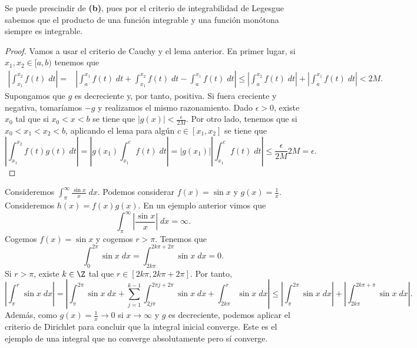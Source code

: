 \begin{observation}
\normalfont Se puede prescindir de \textbf{(b)}, pues por el criterio de integrabilidad de Legesgue sabemos que el producto de una función integrable y una función monótona siempre es integrable.
\end{observation}
\begin{proof}
Vamos a usar el criterio de Cauchy y el lema anterior. En primer lugar, si $\displaystyle x_{1}, x_{2} \in [a,b) $ tenemos que
\[
\begin{split}
	\left|\int^{x_{2}}_{x_{1}} f\left(t\right) \; dt\right| = & \left|\int^{x_{1}}_{a} f\left(t\right) \; dt + \int^{x_{2}}_{x_{1}} f\left(t\right) \; dt - \int^{x_{1}}_{a} f\left(t\right) \; dt\right| \leq \left|\int^{x_{2}}_{a} f\left(t\right) \; dt\right| + \left|\int^{x_{1}}_{a} f\left(t\right) \; dt\right| < 2M.
\end{split}
\]
Supongamos que $\displaystyle g $ es decreciente y, por tanto, positiva. Si fuera creciente y negativa, tomaríamos $\displaystyle -g $ y realizamos el mismo razonamiento. Dado $\displaystyle \epsilon > 0 $, existe $\displaystyle x_{0} $ tal que si $\displaystyle x_{0} < x < b $ se tiene que $\displaystyle \left|g\left(x\right)\right| < \frac{\epsilon }{2M} $. 
Por otro lado, tenemos que si $\displaystyle x_{0} < x_{1} < x_{2} < b $, aplicando el lema para algún $\displaystyle c \in \left[x_{1}, x_{2}\right]  $ se tiene que
\[ \left|\int^{x_{2}}_{x_{1}} f\left(t\right)g\left(t\right) \; dt\right| = \left|g\left(x_{1}\right)\int^{c}_{x_{1}} f\left(t\right) \; dt\right| = \left|g\left(x_{1}\right)\right| \left|\int^{c}_{x_{1}} f\left(t\right) \; dt\right| \leq \frac{\epsilon }{2M}2M = \epsilon  .\]
\end{proof}
\begin{eg}
\normalfont Consideremos $\displaystyle \int^{\infty}_{\pi} \frac{\sin x}{x} \; dx $. Podemos considerar $\displaystyle f\left(x\right) = \sin x$ y $\displaystyle g\left(x\right) = \frac{1}{x} $. Consideremos $\displaystyle h\left(x\right) = f\left(x\right)g\left(x\right) $. En un ejemplo anterior vimos que
\[ \int^{\infty}_{\pi} \left|\frac{\sin x}{x}\right| \; dx = \infty .\]
Cogemos $\displaystyle f\left(x\right) = \sin x $ y cogemos $\displaystyle r > \pi  $. Tenemos que 
\[\int^{2\pi }_{0} \sin x \; dx = \int^{2k\pi + 2\pi }_{2k\pi } \sin x \; dx = 0 .\]
Si $\displaystyle r > \pi  $, existe $\displaystyle k \in \Z  $ tal que $\displaystyle r \in \left[2k\pi, 2k\pi + 2\pi\right]  $. Por tanto, 
\[ \left|\int^{r}_{\pi } \sin x \; dx\right| = \left|\int^{2\pi }_{\pi } \sin x \; dx + \sum^{k-1}_{j=1}\int^{2\pi j + 2\pi }_{2j\pi} \sin x \; dx + \int^{r}_{2k\pi } \sin x \; dx\right|\leq \left|\int^{2\pi }_{\pi } \sin x \; dx\right| + \left|\int^{2k\pi + \pi }_{2k\pi } \sin x \; dx\right|.\]
Además, como $\displaystyle g\left(x\right) = \frac{1}{x} \to 0 $ si $\displaystyle x \to \infty $ y $\displaystyle g $ es decreciente, podemos aplicar el criterio de Dirichlet para concluir que la integral inicial converge. Este es el ejemplo de una integral que no converge absolutamente pero sí converge.
\end{eg}
